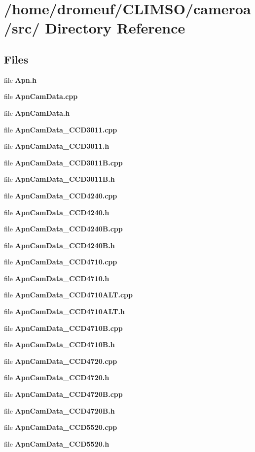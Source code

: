 \section{/home/dromeuf/CLIMSO/cameroa/src/ Directory Reference}
\label{dir_240eadcd5b2e9ee71919c2387bfb56ce}
\subsection*{Files}
\begin{CompactItemize}
\item 
file {\bf Apn.h}
\item 
file {\bf Apn\-Cam\-Data.cpp}
\item 
file {\bf Apn\-Cam\-Data.h}
\item 
file {\bf Apn\-Cam\-Data\_\-CCD3011.cpp}
\item 
file {\bf Apn\-Cam\-Data\_\-CCD3011.h}
\item 
file {\bf Apn\-Cam\-Data\_\-CCD3011B.cpp}
\item 
file {\bf Apn\-Cam\-Data\_\-CCD3011B.h}
\item 
file {\bf Apn\-Cam\-Data\_\-CCD4240.cpp}
\item 
file {\bf Apn\-Cam\-Data\_\-CCD4240.h}
\item 
file {\bf Apn\-Cam\-Data\_\-CCD4240B.cpp}
\item 
file {\bf Apn\-Cam\-Data\_\-CCD4240B.h}
\item 
file {\bf Apn\-Cam\-Data\_\-CCD4710.cpp}
\item 
file {\bf Apn\-Cam\-Data\_\-CCD4710.h}
\item 
file {\bf Apn\-Cam\-Data\_\-CCD4710ALT.cpp}
\item 
file {\bf Apn\-Cam\-Data\_\-CCD4710ALT.h}
\item 
file {\bf Apn\-Cam\-Data\_\-CCD4710B.cpp}
\item 
file {\bf Apn\-Cam\-Data\_\-CCD4710B.h}
\item 
file {\bf Apn\-Cam\-Data\_\-CCD4720.cpp}
\item 
file {\bf Apn\-Cam\-Data\_\-CCD4720.h}
\item 
file {\bf Apn\-Cam\-Data\_\-CCD4720B.cpp}
\item 
file {\bf Apn\-Cam\-Data\_\-CCD4720B.h}
\item 
file {\bf Apn\-Cam\-Data\_\-CCD5520.cpp}
\item 
file {\bf Apn\-Cam\-Data\_\-CCD5520.h}
\item 

\end{CompactItemize}

